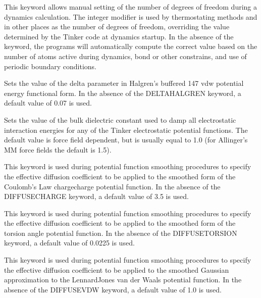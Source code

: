 \documentclass[letterpaper,11pt,english]{sphinxmanual}
\begin{document}
  This keyword allows manual setting of the number of degrees of freedom during a dynamics calculation. The integer modifier is used by thermostating methods and in other places as the number of degrees of freedom, overriding the value determined by the Tinker code at dynamics startup. In the absence of the keyword, the programs will automatically compute the correct value based on the number of atoms active during dynamics, bond or other constrains, and use of periodic boundary conditions.

  Sets the value of the delta parameter in Halgren’s buffered 14\sphinxhyphen{}7 vdw potential energy functional form. In the absence of the DELTA\sphinxhyphen{}HALGREN keyword, a default value of 0.07 is used.




  Sets the value of the bulk dielectric constant used to damp all electrostatic interaction energies for any of the Tinker electrostatic potential functions. The default value is force field dependent, but is usually equal to 1.0 (for Allinger’s MM force fields the default is 1.5).


  This keyword is used during potential function smoothing procedures to specify the effective diffusion coefficient to be applied to the smoothed form of the Coulomb’s Law charge\sphinxhyphen{}charge potential function. In the absence of the DIFFUSE\sphinxhyphen{}CHARGE keyword, a default value of 3.5 is used.

  This keyword is used during potential function smoothing procedures to specify the effective diffusion coefficient to be applied to the smoothed form of the torsion angle potential function. In the absence of the DIFFUSE\sphinxhyphen{}TORSION keyword, a default value of 0.0225 is used.

  This keyword is used during potential function smoothing procedures to specify the effective diffusion coefficient to be applied to the smoothed Gaussian approximation to the Lennard\sphinxhyphen{}Jones van der Waals potential function. In the absence of the DIFFUSE\sphinxhyphen{}VDW keyword, a default value of 1.0 is used.
\end{document}
